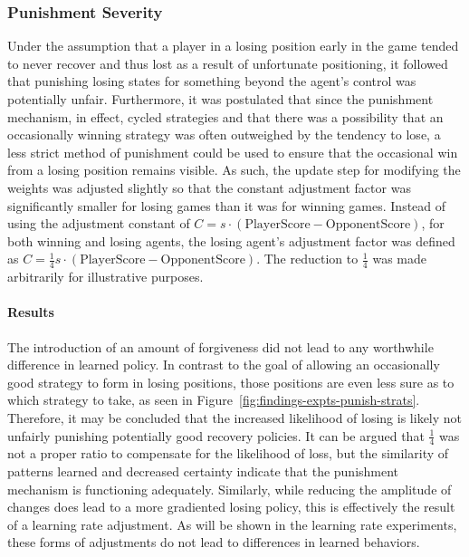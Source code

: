 
\subsubsection*{Punishment Severity}
\label{sec:findings-expts-punishments}

Under the assumption that a player in a losing position
early in the game tended to never recover and thus lost as a result of
unfortunate positioning,
it followed that punishing losing states for something beyond the agent's
control was potentially unfair.
%
Furthermore,
it was postulated that since the punishment mechanism, in effect, cycled
strategies
and that there was a possibility that an occasionally winning strategy was often
outweighed by the tendency to lose,
a less strict method of punishment could be used to ensure that the occasional
win from a losing position remains visible.
%
As such,
the update step for modifying the weights was adjusted slightly
so that the constant adjustment factor was significantly smaller for losing
games than it was for winning games.
%
Instead of using the adjustment constant of
$C = s \cdot (\text{PlayerScore} - \text{OpponentScore})$,
for both winning and losing agents,
the losing agent's adjustment factor was defined as
$C = \frac{1}{4} s \cdot (\text{PlayerScore} - \text{OpponentScore})$.
%
The reduction to $\frac{1}{4}$ was made arbitrarily for illustrative purposes.

\paragraph*{Results}

The introduction of an amount of forgiveness did not lead to any worthwhile
difference in learned policy.
%
In contrast to the goal of allowing an occasionally good strategy to form
in losing positions,
those positions are even less sure as to which strategy to take,
as seen in Figure~\ref{fig:findings-expts-punish-strats}.
%
Therefore,
it may be concluded that the increased likelihood of losing is 
likely not unfairly punishing potentially good recovery policies.
%
It can be argued that $\frac{1}{4}$ was not a proper ratio
to compensate for the likelihood of loss,
but the similarity of patterns learned and decreased certainty
indicate that the punishment mechanism is functioning adequately.
%
Similarly,
while reducing the amplitude of changes
does lead to a more gradiented losing policy,
this is effectively the result of a learning rate adjustment.
%
As will be shown in the learning rate experiments,
these forms of adjustments do not lead to differences in learned behaviors.



